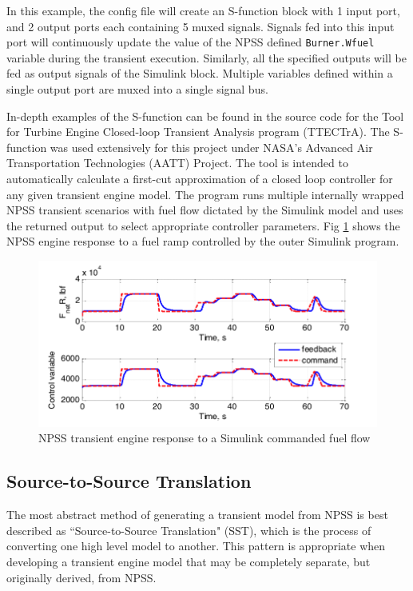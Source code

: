 \documentclass[heading.tex]{subfiles}
\begin{document}
In this example, the config file will create an S-function block with 1 input port,
and 2 output ports each containing 5 muxed signals.
Signals fed into this input port will continuously update the value of the NPSS defined \texttt{Burner.Wfuel}
variable during the transient execution. Similarly, all the specified outputs will be fed as output
signals of the Simulink block.
Multiple variables defined within a single output port are muxed into a single signal bus.

In-depth examples of the S-function can be found in the source code for the
Tool for Turbine Engine Closed-loop Transient Analysis program (TTECTrA). \cite{TTECTrA}
The S-function was used extensively for this project under
NASA's Advanced Air Transportation Technologies (AATT) Project.
The tool is intended to automatically calculate a first-cut approximation of
a closed loop controller for any given transient engine model.
The program runs multiple internally wrapped NPSS transient scenarios
with fuel flow dictated by the Simulink model and uses the returned output to
select appropriate controller parameters. Fig \ref{f:TransientTrace} shows
the NPSS engine response to a fuel ramp controlled by the outer Simulink program.

\begin{figure}[H]
\centering
\includegraphics[width=1.0\textwidth]{images/transientTrace}
\caption{NPSS transient engine response to a Simulink commanded fuel flow}
\label{f:TransientTrace}
\end{figure}


\subsection{Source-to-Source Translation}

The most abstract method of generating a transient model from NPSS is best described as ``Source-to-Source Translation"
(SST), which is the process of converting one high level model to another. This pattern is appropriate when developing
a transient engine model that may be completely separate, but originally derived, from NPSS.
\end{document}
